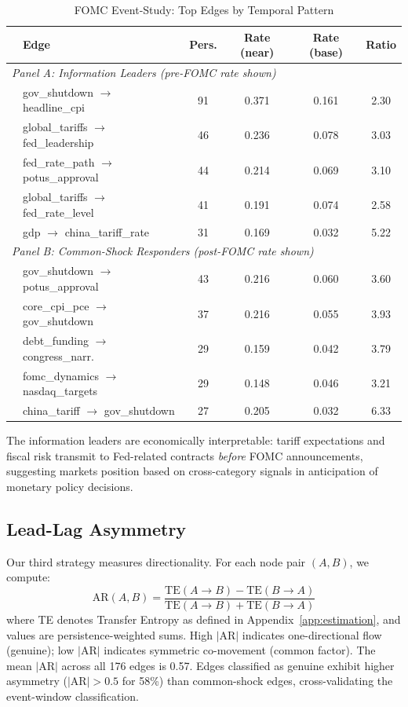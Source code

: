 \documentclass[12pt,letterpaper]{article}
\begin{document}
\begin{table}[H]
\centering
\caption{FOMC Event-Study: Top Edges by Temporal Pattern}\label{tab:fomc}
\small
\begin{tabular}{llcccc}
\toprule
& Edge & Pers. & Rate (near) & Rate (base) & Ratio \\
\midrule
\multicolumn{6}{l}{\textit{Panel A: Information Leaders (pre-FOMC rate shown)}} \\
& gov\_shutdown $\to$ headline\_cpi & 91 & 0.371 & 0.161 & 2.30 \\
& global\_tariffs $\to$ fed\_leadership & 46 & 0.236 & 0.078 & 3.03 \\
& fed\_rate\_path $\to$ potus\_approval & 44 & 0.214 & 0.069 & 3.10 \\
& global\_tariffs $\to$ fed\_rate\_level & 41 & 0.191 & 0.074 & 2.58 \\
& gdp $\to$ china\_tariff\_rate & 31 & 0.169 & 0.032 & 5.22 \\
\midrule
\multicolumn{6}{l}{\textit{Panel B: Common-Shock Responders (post-FOMC rate shown)}} \\
& gov\_shutdown $\to$ potus\_approval & 43 & 0.216 & 0.060 & 3.60 \\
& core\_cpi\_pce $\to$ gov\_shutdown & 37 & 0.216 & 0.055 & 3.93 \\
& debt\_funding $\to$ congress\_narr. & 29 & 0.159 & 0.042 & 3.79 \\
& fomc\_dynamics $\to$ nasdaq\_targets & 29 & 0.148 & 0.046 & 3.21 \\
& china\_tariff $\to$ gov\_shutdown & 27 & 0.205 & 0.032 & 6.33 \\
\bottomrule
\end{tabular}
\end{table}

The information leaders are economically interpretable: tariff expectations and fiscal risk transmit to Fed-related contracts \textit{before} FOMC announcements, suggesting markets position based on cross-category signals in anticipation of monetary policy decisions.

\subsection{Lead-Lag Asymmetry}

Our third strategy measures directionality. For each node pair $(A,B)$, we compute:
\begin{equation}
\text{AR}(A,B) = \frac{\text{TE}(A \to B) - \text{TE}(B \to A)}{\text{TE}(A \to B) + \text{TE}(B \to A)}
\end{equation}
where TE denotes Transfer Entropy as defined in Appendix~\ref{app:estimation}, and values are persistence-weighted sums. High $|\text{AR}|$ indicates one-directional flow (genuine); low $|\text{AR}|$ indicates symmetric co-movement (common factor). The mean $|\text{AR}|$ across all 176 edges is 0.57. Edges classified as genuine exhibit higher asymmetry ($|\text{AR}|>0.5$ for 58\%) than common-shock edges, cross-validating the event-window classification.
\end{document}
